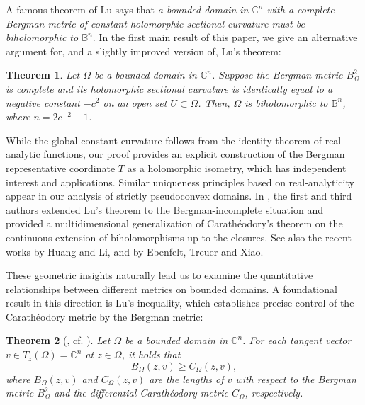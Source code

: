 \documentclass[12pt] {article}
\newtheorem{theorem}{Theorem}[section]
\numberwithin{equation}{section}
\begin{document}
  


 A famous theorem of Lu \cite{Lu} says that {\it a bounded domain in $\mathbb{C}^n$ with a complete Bergman metric of constant holomorphic sectional curvature must be biholomorphic to $\mathbb{B}^n$}. In the first main result of this paper, we give an alternative argument for, and a slightly improved version of, Lu's theorem:

\begin{theorem} \label{nice cor}
Let $\Omega$ be a bounded domain in $\mathbb{C}^n$. Suppose the Bergman metric $B^{2}_{\Omega}$ is complete and its holomorphic sectional curvature is identically equal to a negative constant $-c^2$ on an open set $U \subset \Omega$. Then, $\Omega$ is biholomorphic to $\mathbb{B}^n$, where $n = 2c^{-2}-1$.
\end{theorem}


While the global constant curvature follows from the identity theorem of real-analytic functions, our proof provides an explicit construction of the Bergman representative coordinate $T$ as a holomorphic isometry, which has independent interest and applications. Similar uniqueness principles based on real-analyticity appear in our analysis of strictly pseudoconvex domains. In \cite{DWo, DWo2}, the first and third authors extended Lu's theorem to the Bergman-incomplete situation and provided a multidimensional generalization of Carath\'eodory's theorem on the continuous extension of biholomorphisms up to the closures. See also the recent works \cite{HL} by Huang and Li, and \cite{ETX} by Ebenfelt, Treuer and Xiao.



 

 
 
   \medskip


 
 
These geometric insights naturally lead us to examine the quantitative relationships between different metrics on bounded domains. A foundational result in this direction is Lu's inequality, which establishes precise control of the Carath\'eodory metric by the Bergman metric:


 

\begin{theorem}[\cite{Look}, cf. \cite{CXZ}] \label{Lu's}
Let $\Omega$ be a bounded domain in $\mathbb{C}^n$. For each tangent vector $v \in T_z(\Omega) = \mathbb{C}^n$ at $z \in \Omega$, it holds that
$$
B_{\Omega}(z, v) \geq C_{\Omega}(z, v),
$$
where $B_{\Omega}(z, v)$ and $C_{\Omega}(z, v)$ are the lengths of $v$ with respect to the Bergman metric $B^2_{\Omega}$ and the differential Carath\'eodory metric $C_{\Omega}$, respectively.
\end{theorem}
\end{document}
